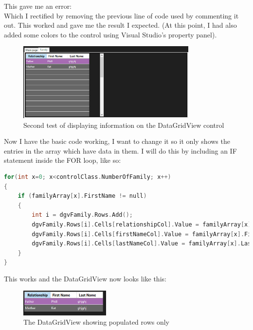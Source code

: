 This gave me an error: \\
Which I rectified by removing the previous line of code used by commenting it out. This worked and gave me the result I expected. (At this point, I had also added some colors to the control using Visual Studio's property panel).
\begin{figure}[H]
    \centering
    \includegraphics[width=0.8\textwidth]{images/implementation/familyTabSecondTest.png}
    \caption{Second test of displaying information on the DataGridView control}
    \label{fig:implementation-familyTabSecondTest}
\end{figure}
\noindent Now I have the basic code working, I want to change it so it only shows the entries in the array which have data in them. I will do this by including an IF statement inside the FOR loop, like so:
\begin{lstlisting}[language=c, style=csharp, caption=Improved code for displaying data in the DataGridView]
for(int x=0; x<controlClass.NumberOfFamily; x++)
{
    if (familyArray[x].FirstName != null)
    {
        int i = dgvFamily.Rows.Add();
        dgvFamily.Rows[i].Cells[relationshipCol].Value = familyArray[x].RelationshipToMain;
        dgvFamily.Rows[i].Cells[firstNameCol].Value = familyArray[x].FirstName;
        dgvFamily.Rows[i].Cells[lastNameCol].Value = familyArray[x].LastName;
    }
}
\end{lstlisting}
This works and the DataGridView now looks like this:
\begin{figure}[H]
    \centering
    \includegraphics[width=0.4\textwidth]{images/implementation/familyTabFinalDGVTest.png}
    \caption{The DataGridView showing populated rows only}
    \label{fig:implementation-familyTabFinalDGVTest}
\end{figure}
